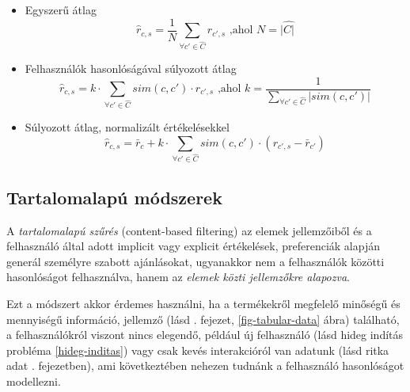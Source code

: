 \documentclass[
]{thesis-ekf}
\theoremstyle{definition}
\theoremstyle{remark}
\begin{document}
\begin{itemize}
	\item Egyszerű átlag
		\[	\hat{r}_{c,s}=\frac{1}{N}\sum_{\forall c' \in \hat{C}}r_{c',s} \text{ ,ahol } N=|\hat{C|}\]

	\item Felhasználók hasonlóságával súlyozott átlag
		\[\hat{r}_{c,s}=k\cdot \sum_{\forall c' \in \hat{C}} sim(c,c')\cdot r_{c',s} \text{ ,ahol } k=\frac{1}{\sum_{\forall c' \in \hat{C}}|sim(c,c')|}\]
		
	\item Súlyozott átlag, normalizált értékelésekkel
		\[\hat{r}_{c,s}=\bar{r}_{c}+k\cdot \sum_{\forall c' \in \hat{C}}sim(c,c')\cdot(r_{c',s}-\bar{r}_{c'})\]
		
\end{itemize}
\cite{werner-ajanlo-rendszer}

\subsection{Tartalomalapú módszerek}
\label{subsec-tartalomalapu}
A \emph{tartalomalapú szűrés} (content-based filtering) az elemek jellemzőiből és a felhasználó által adott implicit vagy explicit értékelések, preferenciák alapján generál személyre szabott ajánlásokat, ugyanakkor nem a felhasználók közötti hasonlóságot felhasználva, hanem az \emph{elemek közti jellemzőkre alapozva}.\cite{recommender-systems-the-textboox,the-adaptive-web}

Ezt a módszert akkor érdemes használni, ha a termékekről megfelelő minőségű és mennyiségű információ, jellemző (lásd . fejezet, \ref{fig-tabular-data} ábra) található, a felhasználókról viszont nincs elegendő, például új felhasználó (lásd hideg indítás probléma \ref{hideg-inditas}) vagy csak kevés interakcióról van adatunk (lásd ritka adat . fejezetben), ami következtében nehezen tudnánk a felhasználó hasonlóságot modellezni.\cite{wiki-recommender-system}
\end{document}
